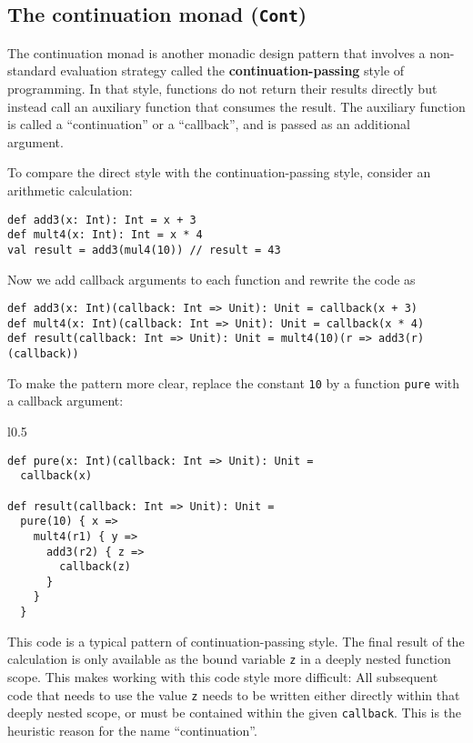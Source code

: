 \subsection{The continuation monad (\texttt{Cont})}

The
continuation monad is another monadic design pattern that involves
a non-standard evaluation strategy called the \textbf{continuation-passing}
style of programming. In that
style, functions do not return their results directly but instead
call an auxiliary function that consumes the result. The auxiliary
function is called a \textsf{``}continuation\textsf{''} or a \textsf{``}callback\textsf{''}, and is
passed as an additional argument.

To compare the direct style with the continuation-passing style, consider
an arithmetic calculation:
\begin{lstlisting}
def add3(x: Int): Int = x + 3
def mult4(x: Int): Int = x * 4
val result = add3(mul4(10)) // result = 43
\end{lstlisting}
Now we add callback arguments to each function and rewrite the code
as
\begin{lstlisting}
def add3(x: Int)(callback: Int => Unit): Unit = callback(x + 3)
def mult4(x: Int)(callback: Int => Unit): Unit = callback(x * 4)
def result(callback: Int => Unit): Unit = mult4(10)(r => add3(r)(callback))
\end{lstlisting}
To make the pattern more clear, replace the constant \lstinline!10!
by a function \lstinline!pure! with a callback argument:

\begin{wrapfigure}{l}{0.5\columnwidth}%
\vspace{-0.8\baselineskip}
\begin{lstlisting}
def pure(x: Int)(callback: Int => Unit): Unit =
  callback(x)

def result(callback: Int => Unit): Unit =
  pure(10) { x =>
    mult4(r1) { y =>
      add3(r2) { z =>
        callback(z)
      }
    }
  }
\end{lstlisting}

\vspace{-1\baselineskip}
\end{wrapfigure}%

\noindent This code is a typical pattern of continuation-passing style.
The final result of the calculation is only available as the bound
variable \lstinline!z! in a deeply nested function scope. This makes
working with this code style more difficult: All subsequent code that
needs to use the value \lstinline!z! needs to be written either directly
within that deeply nested scope, or must be contained within the given
\lstinline!callback!. This is the heuristic reason for the name \textsf{``}continuation\textsf{''}.


